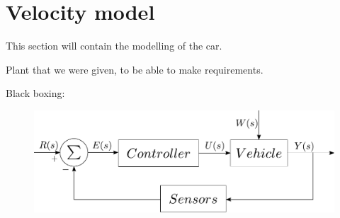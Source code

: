 \section{Velocity model}
This section will contain the modelling of the car.

Plant that we were given, to be able to make requirements.

Black boxing:


\begin{figure}[H]
	\centering
	\includegraphics[scale=0.6]{figures/StartTotalModelsystem.pdf}
	\caption{}
	\label{fig:StartTotalModelsystem}
\end{figure}
